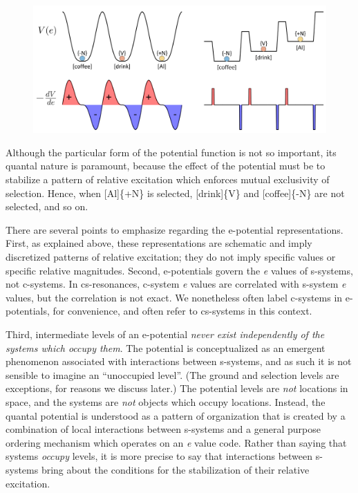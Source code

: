   
\begin{figure}
\includegraphics[width=\textwidth]{figures/Tilsen-img24.png}
\caption{\missingcaption}
\label{fig:2:17}
\end{figure}
 

  Although the particular form of the potential function is not so important, its quantal nature is paramount, because the effect of the potential must be to stabilize a pattern of relative excitation which enforces mutual exclusivity of selection. Hence, when [Al]\{+N\} is selected, [drink]\{V\} and [coffee]\{-N\} are not selected, and so on. 

  There are several points to emphasize regarding the e-potential representations. First, as explained above, these representations are schematic and imply discretized patterns of relative excitation; they do not imply specific values or specific relative magnitudes. Second, e-potentials govern the \textit{e} values of s-systems, not c-systems. In cs-resonances, c-system \textit{e} values are correlated with s-system \textit{e} values, but the correlation is not exact. We nonetheless often label c-systems in e-potentials, for convenience, and often refer to cs-systems in this context. 

  Third, intermediate levels of an e-potential \textit{never exist independently of the systems which occupy them}. The potential is conceptualized as an emergent phenomenon associated with interactions between s-systems, and as such it is not sensible to imagine an “unoccupied level”. (The ground and selection levels are exceptions, for reasons we discuss later.) The potential levels are \textit{not} locations in space, and the systems are \textit{not} objects which occupy locations. Instead, the quantal potential is understood as a pattern of organization that is created by a combination of local interactions between s-systems and a general purpose ordering mechanism which operates on an \textit{e} value code. Rather than saying that systems \textit{occupy} levels, it is more precise to say that interactions between s-systems bring about the conditions for the stabilization of their relative excitation.

